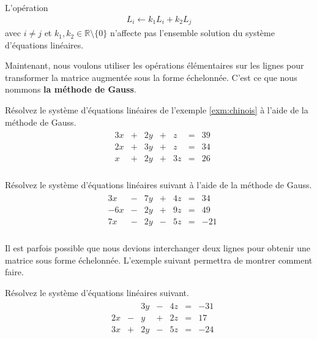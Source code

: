 \documentclass[]{book}
\theoremstyle{definition}
\theoremstyle{definition}
\theoremstyle{definition}
\theoremstyle{remark}
\let\BeginKnitrBlock\begin \let\EndKnitrBlock\end
\begin{document}
\BeginKnitrBlock{proposition}
\protect\hypertarget{prp:unnamed-chunk-19}{}{\label{prp:unnamed-chunk-19} }L'opération
\begin{align*}
L_i\leftarrow k_1L_i+k_2L_j
\end{align*}
avec \(i\neq j\) et \(k_1,k_2\in\mathbb{R}\setminus \{0\}\) n'affecte pas l'ensemble solution du système d'équations linéaires.
\EndKnitrBlock{proposition}

Maintenant, nous voulons utiliser les opérations élémentaires sur les lignes pour transformer la matrice augmentée sous la forme échelonnée. C'est ce que nous nommons \textbf{la méthode de Gauss}.

\BeginKnitrBlock{example}
\protect\hypertarget{exm:unnamed-chunk-20}{}{\label{exm:unnamed-chunk-20} }Résolvez le système d'équations linéaires de l'exemple \ref{exm:chinois} à l'aide de la méthode de Gauss.
\begin{align*}
\begin{array}{cccccccc}
&3x&+&2y&+&z&=&39\\
&2x&+&3y&+&z&=&34\\
&x&+&2y&+&3z&=&26\\
\end{array}
\end{align*}
\EndKnitrBlock{example}

\BeginKnitrBlock{example}
\protect\hypertarget{exm:unnamed-chunk-21}{}{\label{exm:unnamed-chunk-21} }Résolvez le système d'équations linéaires suivant à l'aide de la méthode de Gauss.
\begin{align*}
\begin{array}{cccccccc}
&3x&-&7y&+&4z&=&34\\
&-6x&-&2y&+&9z&=&49\\
&7x&-&2y&-&5z&=&-21\\
\end{array}
\end{align*}
\EndKnitrBlock{example}

Il est parfois possible que nous devions interchanger deux lignes pour obtenir une matrice sous forme échelonnée. L'exemple suivant permettra de montrer comment faire.

\BeginKnitrBlock{example}
\protect\hypertarget{exm:unnamed-chunk-22}{}{\label{exm:unnamed-chunk-22} }Résolvez le système d'équations linéaires suivant.
\begin{align*}
\begin{array}{cccccccc}
&&&3y&-&4z&=&-31\\
&2x&-&y&+&2z&=&17\\
&3x&+&2y&-&5z&=&-24\\
\end{array}
\end{align*}
\EndKnitrBlock{example}
\end{document}
